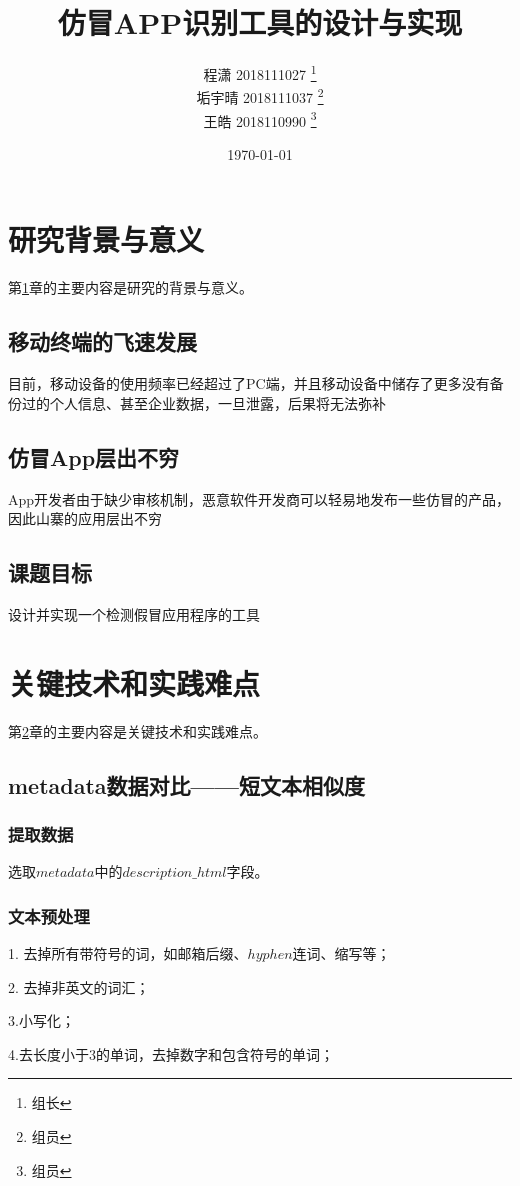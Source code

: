 \documentclass[UTF8,a4paper,10pt, twocolumn]{ctexart}
\title{仿冒APP识别工具的设计与实现}
\author{ 程潇 2018111027  \thanks{组长}\\
垢宇晴 2018111037  \thanks{组员}\\
王皓 2018110990  \thanks{组员}
}
\date{\today}
\begin{document}
    \maketitle
    \thispagestyle{fancy}

\section{研究背景与意义} \label{sec:one}
    第\ref{sec:one}章的主要内容是研究的背景与意义。
\subsection{移动终端的飞速发展}
目前，移动设备的使用频率已经超过了PC端，并且移动设备中储存了更多没有备份过的个人信息、甚至企业数据，一旦泄露，后果将无法弥补

\subsection{仿冒App层出不穷}
App开发者由于缺少审核机制，恶意软件开发商可以轻易地发布一些仿冒的产品，因此山寨的应用层出不穷

\subsection{课题目标}
设计并实现一个检测假冒应用程序的工具

\section{关键技术和实践难点} \label{sec:two}
   第\ref{sec:two}章的主要内容是关键技术和实践难点。
\subsection{metadata数据对比——短文本相似度}
\subsubsection{提取数据}
选取$metadata$中的$description\_html$字段。

\subsubsection{文本预处理}
1. 去掉所有带符号的词，如邮箱后缀、$hyphen$连词、缩写等；

2. 去掉非英文的词汇；

3.小写化；

4.去长度小于3的单词，去掉数字和包含符号的单词；
\end{document}
